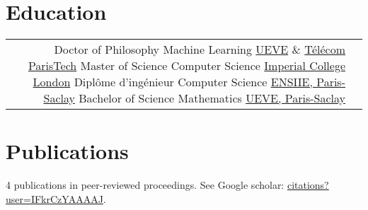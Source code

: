 \documentclass[10pt]{article} %
\begin{document}
\begin{paracol}{2}
\section{Education}
%
%
%
%
%
\begin{supertabular}{rl} %
%
%
    {Doctor of Philosophy} %
    {} %
    {Machine Learning} %
    {\href{https://www.ibisc.univ-evry.fr/}{UEVE} \&
     \href{https://ltci.telecom-paristech.fr/}{T\'el\'ecom ParisTech}}
%
%
    {Master of Science} %
    {} %
    {Computer Science} %
    {\href{http://www.imperial.ac.uk/computing}{Imperial College London}} %
%
%
    {Dipl\^ome d'ing\'enieur} %
    {} %
    {Computer Science} %
    {\href{http://www.ensiie.fr/}{ENSIIE, Paris-Saclay}}
%
%
    {Bachelor of Science} %
    {} %
    {Mathematics} %
    {\href{https://www.univ-evry.fr/accueil.html}{UEVE, Paris-Saclay}}
%
%
\end{supertabular}
%
%
\section{Publications}
4 publications in peer-reviewed proceedings. See Google scholar:
\href{https://scholar.google.fr/citations?user=IFkrCzYAAAAJ}{citations?user=IFkrCzYAAAAJ}.
\medskip
%
%

\end{paracol}
\end{document}
